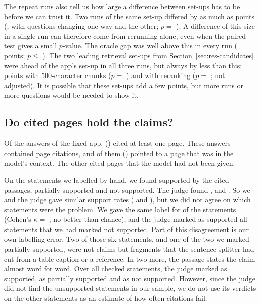 The repeat runs also tell us how large a difference between set-ups has to be before we can
trust it. Two runs of the same set-up differed by as much as \RepeatWidestPoints{} points
(\RepeatWidestSetup{}, with \RepeatWidestGained{} questions changing one way and
\RepeatWidestLost{} the other; $p =$ \RepeatWidestP{}). A difference of this size in a single run
can therefore come from rerunning alone, even when the paired test gives a small $p$-value. The
oracle gap was well above this in every run (\RepeatOracleVsFixedDiffs{} points; $p \le$
\RepeatOracleVsFixedMaxP{}). The two leading retrieval set-ups from
Section~\ref{sec:res-candidates} were ahead of the app's set-up in all three runs, but always by
less than this: \RepeatSmallVsFixedDiffs{} points with 500-character chunks ($p =$
\RepeatSmallVsFixedPs{}) and \RepeatSmallRerankVsFixedDiffs{} with reranking ($p =$
\RepeatSmallRerankVsFixedPs{}; not adjusted). It is possible that these set-ups add a few points,
but more runs or more questions would be needed to show it.

\subsection{Do cited pages hold the claims?}
\label{sec:res-citations}

Of the \CiteAnswers{} answers of the fixed app, \CiteAnswersCiting{} (\CiteAnswersCitingRate{})
cited at least one page. These answers contained \CitePages{} page citations, and
\CitePagesInContext{} of them (\CitePagesInContextRate{}) pointed to a page that was in the
model's context. The other \CitePagesOutside{} cited pages that the model had not been given.

On the \CiteHandN{} statements we labelled by hand, we found \CiteLabellerSupported{} supported by
the cited passages, \CiteLabellerPartial{} partially supported and \CiteLabellerNot{} not
supported. The judge found \CiteJudgeSupported{}, \CiteJudgePartial{} and \CiteJudgeNot{}. So we
and the judge gave similar support rates (\CiteLabellerRate{} and \CiteJudgeRate{}), but we did
not agree on which statements were the problem. We gave the same label for \CiteHandExact{} of
the \CiteHandN{} statements (Cohen's $\kappa =$ \CiteHandKappa{}, no better than chance), and the
judge marked as supported all \CiteNotJudgedSupported{} statements that we had marked not
supported. Part of this disagreement is our own labelling error. Two of those six statements,
and one of the two we marked partially supported, were not claims but fragments that the
sentence splitter had cut from a table caption or a reference. In two more, the passage states
the claim almost word for word. Over all \CiteJudged{} checked statements, the judge marked
\CiteAllSupported{} as supported, \CiteAllPartial{} as partially supported and \CiteAllNot{} as
not supported. However, since the judge did not find the unsupported statements in our sample,
we do not use its verdicts on the other \CiteUnlabelled{} statements as an estimate of how often
citations fail.

